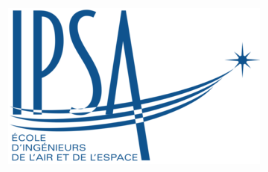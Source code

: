 \documentclass[a4paper,12pt,calibri,oneside,openany]{book}
\theoremstyle{break}
\begin{document}
\renewcommand{\bibname}{Bibliographie et Webographie}

\begin{titlepage}
\begin{center}

\includegraphics[width=0.5\textwidth]{ipsa}\\[1cm]




\end{center}
\end{titlepage}
\end{document}
